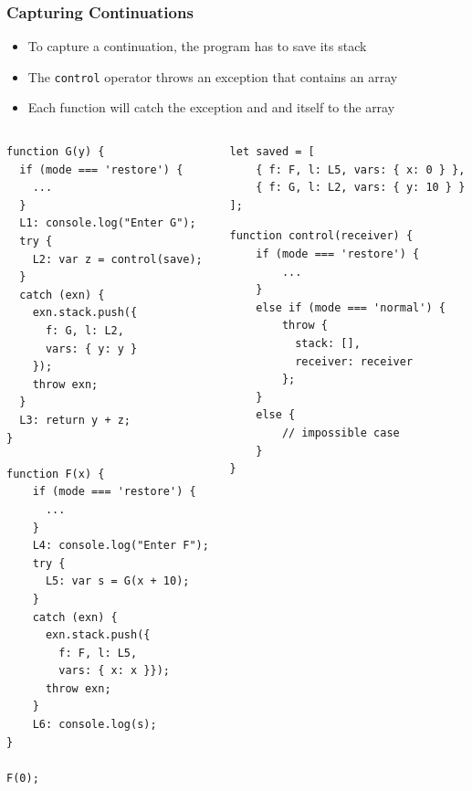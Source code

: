 \documentclass[8pt,pdf,handout]{beamer}
\begin{document}
\begin{frame}[fragile]
\frametitle{Capturing Continuations}

\begin{itemize}

\item To capture a continuation, the program has to
save its stack

\item The \lstinline|control| operator throws an exception
that contains an array

\item Each function will catch the exception and and
itself to the array

\end{itemize}

\pause

\begin{columns}

\begin{column}{0.42\textwidth}

\begin{lstlisting}[basicstyle={\fontsize{6.5}{6.8}\ttfamily}]
function G(y) {
  if (mode === 'restore') {
    ...
  }
  L1: console.log("Enter G");
  try {
    L2: var z = control(save);
  }
  catch (exn) {
    exn.stack.push({
      f: G, l: L2,
      vars: { y: y }
    });
    throw exn;
  }
  L3: return y + z;
}

function F(x) {
    if (mode === 'restore') {
      ...
    }
    L4: console.log("Enter F");
    try {
      L5: var s = G(x + 10);
    }
    catch (exn) {
      exn.stack.push({
        f: F, l: L5,
        vars: { x: x }});
      throw exn;
    }
    L6: console.log(s);
}

F(0);
\end{lstlisting}

\end{column}

\begin{column}{0.54\textwidth}

\begin{lstlisting}
let saved = [
    { f: F, l: L5, vars: { x: 0 } },
    { f: G, l: L2, vars: { y: 10 } }
];
\end{lstlisting}

\begin{lstlisting}
function control(receiver) {
    if (mode === 'restore') {
        ...
    }
    else if (mode === 'normal') {
        throw {
          stack: [],
          receiver: receiver
        };
    }
    else {
        // impossible case
    }
}
\end{lstlisting}

\end{column}
\end{columns}
\end{frame}
\end{document}
